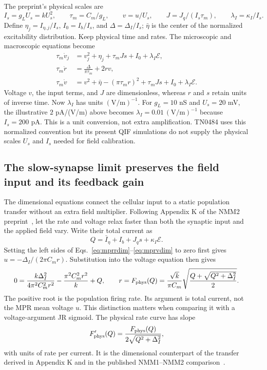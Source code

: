 \documentclass[11pt,a4paper]{article}
\newcommand{\E}{\mathcal E}
\begin{document}
The preprint's physical scales are
\begin{equation}
I_s=g_LU_s=kU_s^2,\qquad \tau_m=C_m/g_L,\qquad
v=u/U_s,\qquad J=J_q/(I_s\tau_m),\qquad
\lambda_I=\kappa_I/I_s.
\label{eq:scales}
\end{equation}
Define $\eta_j=I_{\eta,j}/I_s$, $I_0=I_b/I_s$, and $\Delta=\Delta_I/I_s$; $\bar\eta$ is the center of the normalized excitability distribution. Keep physical time and rates. The microscopic and macroscopic equations become
\begin{align}
\tau_m\dot v_j&=v_j^2+\eta_j+\tau_mJs+I_0+\lambda_I\E,\label{eq:qif}\\
\tau_m\dot r&=\frac{\Delta}{\pi\tau_m}+2rv,\label{eq:mprr}\\
\tau_m\dot v&=v^2+\bar\eta-(\pi\tau_mr)^2+\tau_mJs+I_0+\lambda_I\E.
\label{eq:mprv}
\end{align}
Voltage $v$, the input terms, and $J$ are dimensionless, whereas $r$ and $s$ retain units of inverse time. Now $\lambda_I$ has units $(\mathrm{V/m})^{-1}$. For $g_L=10$ nS and $U_s=20$ mV, the illustrative $2$ pA/(V/m) above becomes $\lambda_I=0.01\,(\mathrm{V/m})^{-1}$ because $I_s=200$ pA. This is a unit conversion, not extra amplification. TN0484 uses this normalized convention but its present QIF simulations do not supply the physical scales $U_s$ and $I_s$ needed for field calibration.

\subsection{The slow-synapse limit preserves the field input and its feedback gain}
\label{sec:slow-field}

The dimensional equations connect the cellular input to a static population transfer without an extra field multiplier. Following Appendix K of the NMM2 preprint~\cite{ruffini}, let the rate and voltage relax faster than both the synaptic input and the applied field vary. Write their total current as
\begin{equation}
Q=\bar I_\eta+I_b+J_qs+\kappa_I\E.
\end{equation}
Setting the left sides of Eqs.~\eqref{eq:mprrdim}--\eqref{eq:mprvdim} to zero first gives $u=-\Delta_I/(2\pi C_mr)$. Substitution into the voltage equation then gives
\begin{equation}
0=\frac{k\Delta_I^2}{4\pi^2C_m^2r^2}
-\frac{\pi^2C_m^2r^2}{k}+Q,
\qquad
r=F_{\rm phys}(Q)
=\frac{\sqrt{k}}{\pi C_m}
\sqrt{\frac{Q+\sqrt{Q^2+\Delta_I^2}}2}.
\label{eq:physical-static}
\end{equation}
The positive root is the population firing rate. Its argument is total current, not the MPR mean voltage $u$. This distinction matters when comparing it with a voltage-argument JR sigmoid. The physical rate curve has slope
\begin{equation}
F_{\rm phys}'(Q)=\frac{F_{\rm phys}(Q)}{2\sqrt{Q^2+\Delta_I^2}},
\label{eq:physical-slope}
\end{equation}
with units of rate per current. It is the dimensional counterpart of the transfer derived in Appendix K and in the published NMM1--NMM2 comparison~\cite{clusella}.
\end{document}
